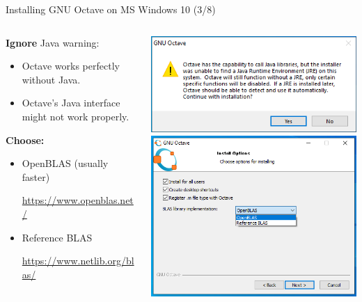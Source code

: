\begin{frame}{Installing GNU Octave on MS Windows 10 (3/8)}
\begin{columns}
\begin{column}{0.5\textwidth}
\textbf{Ignore} Java warning:
\begin{itemize}
\item
Octave works perfectly without Java.

\item
Octave's Java interface might not work properly.
\end{itemize}

\vspace*{2em}

\textbf{Choose:}
\begin{itemize}
\item
{\color{DarkBlue}OpenBLAS} (usually faster)

{\footnotesize \url{https://www.openblas.net/}}

\item
{\color{DarkBlue}Reference BLAS}

{\footnotesize \url{https://www.netlib.org/blas/}}
\end{itemize}
\end{column}
\begin{column}{0.4\textwidth}
\includegraphics[width=\textwidth]{res/ms_windows/win_install_java_warning.png}
\\[1em]
\includegraphics[width=\textwidth]{res/ms_windows/win_install_blas.png}
\end{column}
\end{columns}
\end{frame}



